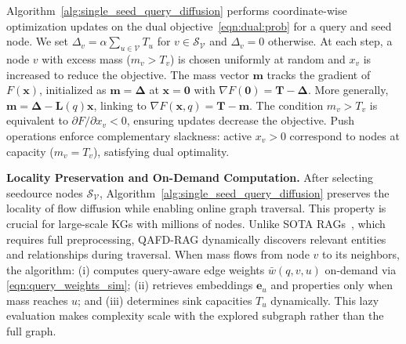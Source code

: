 \documentclass{article} %
\begin{document}
Algorithm~\ref{alg:single_seed_query_diffusion} performs coordinate-wise optimization updates on the dual objective~\eqref{eqn:dual:prob} for a query and seed node. We set $\Delta_v = \alpha \sum_{u \in \mathcal{V}} T_u$ for $v \in \mathcal{S}_{\mathcal{V}}$ and $\Delta_v = 0$ otherwise. At each step, a node $v$ with excess mass ($m_v > T_v$) is chosen uniformly at random and $x_v$ is increased to reduce the objective. The mass vector $\mathbf{m}$ tracks the gradient of $F(\mathbf{x})$, initialized as $\mathbf{m} = \boldsymbol{\Delta}$ at $\mathbf{x} = \mathbf{0}$ with $\nabla F(\mathbf{0}) = \mathbf{T} - \boldsymbol{\Delta}$. More generally, $\mathbf{m} = \boldsymbol{\Delta} - \mathbf{L}(q)\mathbf{x}$, linking to $\nabla F(\mathbf{x},q) = \mathbf{T} - \mathbf{m}$. The condition $m_v > T_v$ is equivalent to $\partial F/\partial x_v < 0$, ensuring updates decrease the objective. Push operations enforce complementary slackness: active $x_v > 0$ correspond to nodes at capacity ($m_v = T_v$), satisfying dual optimality.

\noindent \textbf{Locality Preservation and On-Demand Computation.} After selecting seedource nodes $\mathcal{S}_{\mathcal{V}}$, Algorithm~\ref{alg:single_seed_query_diffusion} preserves the locality of flow diffusion while enabling online graph traversal. This property is crucial for large-scale KGs with millions of nodes. Unlike SOTA RAGs~\citep{edge2024graphrag}, which requires full preprocessing, QAFD-RAG dynamically discovers relevant entities and relationships during traversal. 
When mass flows from node $v$ to its neighbors, the algorithm: (i) computes query-aware edge weights $\bar{w}(q, v, u)$ on-demand via \eqref{eqn:query_weights_sim}; (ii) retrieves embeddings $\mathbf{e}_u$ and properties only when mass reaches $u$; and (iii) determines sink capacities $T_u$ dynamically. This lazy evaluation makes complexity scale with the explored subgraph rather than the full graph. %
\end{document}
